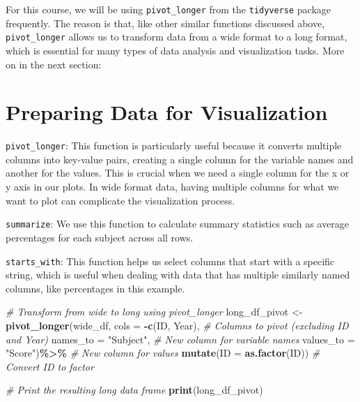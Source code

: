\documentclass[
]{article}
\newenvironment{Shaded}{\begin{snugshade}}{\end{snugshade}}
\newcommand{\AttributeTok}[1]{\textcolor[rgb]{0.13,0.29,0.53}{#1}}
\newcommand{\CommentTok}[1]{\textcolor[rgb]{0.56,0.35,0.01}{\textit{#1}}}
\newcommand{\FunctionTok}[1]{\textcolor[rgb]{0.13,0.29,0.53}{\textbf{#1}}}
\newcommand{\NormalTok}[1]{#1}
\newcommand{\OtherTok}[1]{\textcolor[rgb]{0.56,0.35,0.01}{#1}}
\newcommand{\SpecialCharTok}[1]{\textcolor[rgb]{0.81,0.36,0.00}{\textbf{#1}}}
\newcommand{\StringTok}[1]{\textcolor[rgb]{0.31,0.60,0.02}{#1}}
\begin{document}
For this course, we will be using \texttt{pivot\_longer} from the
\texttt{tidyverse} package frequently. The reason is that, like other
similar functions discussed above, \texttt{pivot\_longer} allows us to
transform data from a wide format to a long format, which is essential
for many types of data analysis and visualization tasks. More on in the
next section:

\hypertarget{preparing-data-for-visualization}{%
\section{Preparing Data for
Visualization}\label{preparing-data-for-visualization}}

\texttt{pivot\_longer}: This function is particularly useful because it
converts multiple columns into key-value pairs, creating a single column
for the variable names and another for the values. This is crucial when
we need a single column for the x or y axis in our plots. In wide format
data, having multiple columns for what we want to plot can complicate
the visualization process.

\texttt{summarize}: We use this function to calculate summary statistics
such as average percentages for each subject across all rows.

\texttt{starts\_with}: This function helps us select columns that start
with a specific string, which is useful when dealing with data that has
multiple similarly named columns, like percentages in this example.

\begin{Shaded}
\begin{Highlighting}[]
\CommentTok{\# Transform from wide to long using pivot\_longer}
\NormalTok{long\_df\_pivot }\OtherTok{\textless{}{-}} \FunctionTok{pivot\_longer}\NormalTok{(wide\_df,}
            \AttributeTok{cols =} \SpecialCharTok{{-}}\FunctionTok{c}\NormalTok{(ID, Year), }\CommentTok{\# Columns to pivot (excluding ID and Year)}
            \AttributeTok{names\_to =} \StringTok{"Subject"}\NormalTok{, }\CommentTok{\# New column for variable names}
            \AttributeTok{values\_to =} \StringTok{"Score"}\NormalTok{)}\SpecialCharTok{\%\textgreater{}\%}  \CommentTok{\# New column for values}
  \FunctionTok{mutate}\NormalTok{(}\AttributeTok{ID =} \FunctionTok{as.factor}\NormalTok{(ID))  }\CommentTok{\# Convert ID to factor}


\CommentTok{\# Print the resulting long data frame}
\FunctionTok{print}\NormalTok{(long\_df\_pivot)}
\end{Highlighting}
\end{Shaded}
\end{document}
